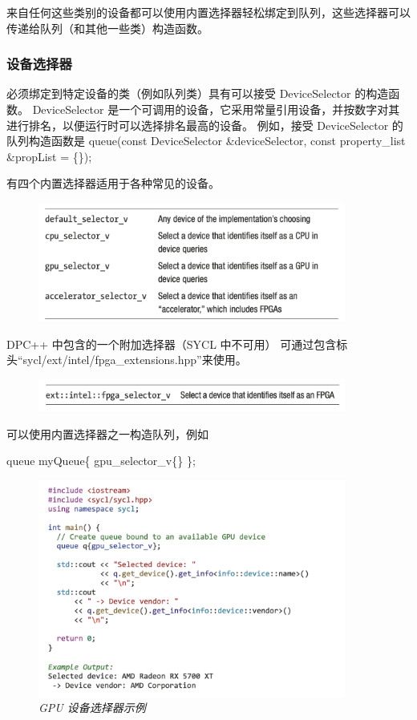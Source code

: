 来自任何这些类别的设备都可以使用内置选择器轻松绑定到队列，这些选择器可以传递给队列（和其他一些类）构造函数。

\subsubsection{设备选择器}
必须绑定到特定设备的类（例如队列类）具有可以接受 DeviceSelector 的构造函数。 
DeviceSelector 是一个可调用的设备，它采用常量引用设备，并按数字对其进行排名，以便运行时可以选择排名最高的设备。 
例如，接受 DeviceSelector 的队列构造函数是
queue(const DeviceSelector \&deviceSelector, const property\_list \&propList = \{\});

有四个内置选择器适用于各种常见的设备。

\begin{figure}
	\centering
	\includegraphics[width=0.9\textwidth]{figs/F2-a1.png}
\end{figure}

DPC++ 中包含的一个附加选择器（SYCL 中不可用）
可通过包含标头“sycl/ext/intel/fpga\_extensions.hpp”来使用。

\begin{figure}
	\centering
	\includegraphics[width=0.9\textwidth]{figs/F2-a2.png}
\end{figure}

可以使用内置选择器之一构造队列，例如

queue myQueue\{ gpu\_selector\_v\{\} \}; 

\begin{figure}[H]
	\centering
	\includegraphics[width=0.9\textwidth]{figs/F2.10.png}
	\caption{\textit{GPU 设备选择器示例}}
\end{figure}

